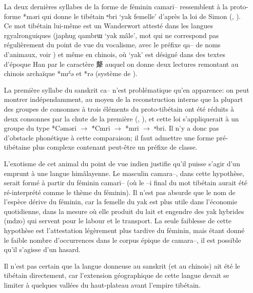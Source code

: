 \documentclass[oldfontcommands,oneside,a4paper,11pt]{article}
\newcommand{\ipa}[1]{{\phon #1}} %
\newcommand{\zh}[1]{{\cn #1}}
\begin{document}
La deux dernières syllabes de la forme de féminin \ipa{camarī--} ressemblent à la proto-forme *\ipa{məri} qui donne le tibétain  \ipa{ⁿbri} `yak femelle' d'après la loi de Simon (\citealt[187]{simon29}, \citealt{hill11laws}). Ce mot tibétain lui-même est un Wanderwort attesté dans les langues rgyalronguiques (japhug \ipa{qambrɯ} `yak mâle', mot qui ne correspond pas régulièrement du point de vue du vocalisme, avec le préfixe \ipa{qa--} de noms d'animaux, voir   \citealt[158-9]{jacques14snom}) et même en chinois, où  `yak' est désigné dans des textes d'époque Han par le caractère \zh{犛} auquel on donne deux lectures remontant au chinois archaïque *\ipa{mrˁə} et *\ipa{rə} (système de \citealt{bs14oc}).

La première syllabe du sanskrit \ipa{ca--} n'est problématique qu'en apparence: on peut montrer indépendamment, au moyen de la reconstruction interne que la plupart des groupes de consonnes à trois éléments du proto-tibétain ont été réduits à deux consonnes par la chute de la première (\citealt{coblin76}, \citealt{hill11laws}), et cette loi s'appliquerait à un groupe du type *\ipa{Cəməri} $\rightarrow$ *\ipa{Cmri} $\rightarrow$ *\ipa{mri} $\rightarrow$ \ipa{ⁿbri}. Il n'y a donc pas d'obstacle phonétique à cette comparaison; il faut admettre une forme pré-tibétaine plus complexe contenant peut-être un préfixe de classe. 
  
L'exotisme de cet animal du point de vue indien justifie qu'il puisse s'agir d'un emprunt à une langue himâlayenne. Le masculin \ipa{camara--}, dans cette hypothèse, serait formé à partir du féminin \ipa{camarī--} (où le \ipa{--i} final du mot tibétain aurait été ré-interprété comme le thème du féminin). Il n'est pas absurde que le nom de l'espèce dérive du féminin, car la femelle du yak est plus utile dans l'économie quotidienne, dans la mesure où elle produit du lait et engendre des yak hybrides (\ipa{mdzo}) qui servent pour le labour et le transport. La seule faiblesse de cette hypothèse est l'attestation légèrement plus tardive du féminin, mais étant donné le faible nombre d'occurrences dans le corpus épique de \ipa{camara--}, il est possible qu'il s'agisse d'un hasard.

Il n'est pas certain que la langue donneuse au sanskrit (et au chinois) ait été le tibétain directement, car l'extension géographique de cette langue devait se limiter à quelques vallées du haut-plateau avant l'empire tibétain. 
  


\end{document}

